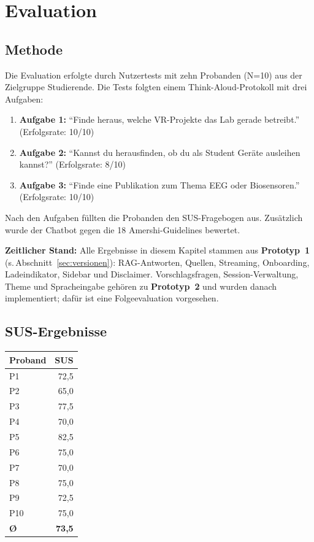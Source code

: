 \section{Evaluation}
\label{sec:evaluation}

\subsection{Methode}

Die Evaluation erfolgte durch Nutzertests mit zehn Probanden (N=10) aus der Zielgruppe Studierende. Die Tests folgten einem Think-Aloud-Protokoll mit drei Aufgaben:

\begin{enumerate}
    \item \textbf{Aufgabe 1:} ``Finde heraus, welche VR-Projekte das Lab gerade betreibt.'' (Erfolgsrate: 10/10)
    \item \textbf{Aufgabe 2:} ``Kannst du herausfinden, ob du als Student Geräte ausleihen kannst?'' (Erfolgsrate: 8/10)
    \item \textbf{Aufgabe 3:} ``Finde eine Publikation zum Thema EEG oder Biosensoren.'' (Erfolgsrate: 10/10)
\end{enumerate}

Nach den Aufgaben füllten die Probanden den SUS-Fragebogen aus. Zusätzlich wurde der Chatbot gegen die 18 Amershi-Guidelines bewertet.

\textbf{Zeitlicher Stand:} Alle Ergebnisse in diesem Kapitel stammen aus \textbf{Prototyp~1} (s.\,Abschnitt~\ref{sec:versionen}): RAG-Antworten, Quellen, Streaming, Onboarding, Ladeindikator, Sidebar und Disclaimer. Vorschlagsfragen, Session-Verwaltung, Theme und Spracheingabe gehören zu \textbf{Prototyp~2} und wurden danach implementiert; dafür ist eine Folgeevaluation vorgesehen.

\subsection{SUS-Ergebnisse}

\begin{center}
\begin{tabular}{@{}lr@{}}
\toprule
\textbf{Proband} & \textbf{SUS} \\
\midrule
P1 & 72,5 \\
P2 & 65,0 \\
P3 & 77,5 \\
P4 & 70,0 \\
P5 & 82,5 \\
P6 & 75,0 \\
P7 & 70,0 \\
P8 & 75,0 \\
P9 & 72,5 \\
P10 & 75,0 \\
\midrule
\textbf{Ø} & \textbf{73,5} \\
\bottomrule
\end{tabular}
\end{center}

